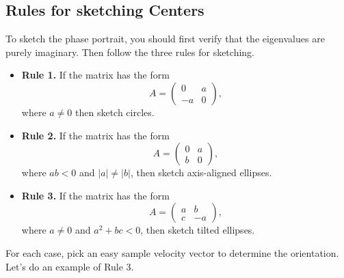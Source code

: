 \documentclass[11pt,letterpaper]{article}
\begin{document}

\subsection{Rules for sketching Centers}
To sketch the phase portrait, you should first verify that the eigenvalues are purely imaginary. Then follow the three rules for sketching.
\begin{itemize} 
\item \textbf{Rule 1.} If the matrix has the form 
    $$ A = \begin{pmatrix}
    0 & a\\
    -a & 0
    \end{pmatrix},$$
    where $a\ne0$ then sketch circles. 

\item \textbf{Rule 2.} If the matrix has the form
$$A = \begin{pmatrix}
    0 & a\\
    b & 0
\end{pmatrix},$$
where $ab<0$ and $|a|\ne|b|$, then sketch axis-aligned ellipses.

\item \textbf{Rule 3.} If the matrix has the form
$$
A = \begin{pmatrix}
    a & b\\
    c & -a
\end{pmatrix},$$ 
where $a\ne0$ and $a^2+bc<0$, then sketch tilted ellipses.
\end{itemize}
For each case, pick an easy sample velocity vector to determine the orientation. Let's do an example of Rule 3.
\end{document}
